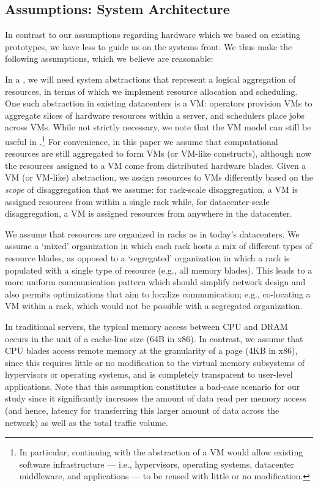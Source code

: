 \vspace{-0.1in}
\subsection{Assumptions: System Architecture}
\vspace{-0.05in}
\label{ssec:system}
In contrast to our assumptions regarding hardware which we based on existing  prototypes, we have less to guide us on the systems front. We thus make the following assumptions, which we believe are reasonable: 

In a \dis, we will need system abstractions that represent a logical aggregation of resources, in terms of which we implement resource allocation and scheduling. 
One such abstraction in existing datacenters is a VM: 
operators provision VMs to aggregate slices of hardware resources within a server, and schedulers place jobs across VMs. 
While not strictly necessary, we note that the VM model can still be useful in \dis.\footnote{In particular, continuing with the abstraction of a VM would allow existing software infrastructure --- i.e., hypervisors, operating systems, datacenter middleware, and applications --- to be reused with little or no modification.} 
For convenience, in this paper we assume that computational resources are still aggregated to form VMs (or VM-like constructs), although now the resources assigned to a VM come from distributed hardware blades. Given a VM (or VM-like) abstraction, we assign resources to VMs differently based on the \emph{scope} of disaggregation that we assume: for rack-scale disaggregation, a VM is assigned resources from within a single rack while, for datacenter-scale disaggregation, a VM is assigned resources from anywhere in the datacenter.

We assume that resources are organized in racks as in today's datacenters. 
We assume a `mixed' organization in which each rack hosts a mix of different types of resource blades, as opposed to a `segregated' organization in which a rack is populated with a single type of resource (e.g., all memory blades). 
This leads to a more uniform communication pattern which should simplify network design and also permits optimizations that aim to localize communication; e.g., co-locating a VM within a rack, which would not be possible with a segregated organization. 

 
In traditional servers, the typical memory access between CPU and DRAM occurs in the unit of a cache-line size (64B in x86). In contrast, we assume that CPU blades access remote memory at the granularity of a page (4KB in x86), since this requires little or no modification to the virtual memory subsystems of hypervisors or operating systems, and is completely transparent to user-level applications. Note that this assumption constitutes a bad-case scenario for our study since it significantly increases the amount of data read per memory access (and hence, latency for transferring this larger amount of data across the network) as well as the total traffic volume.

